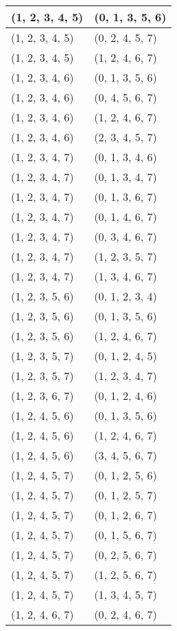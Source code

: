 \begin{footnotesize}
\begin{longtable}[c]{|l|l|}
\\ \hline
(1, 2, 3, 4, 5)
&(0, 1, 3, 5, 6)
\\ \hline
(1, 2, 3, 4, 5)
&(0, 2, 4, 5, 7)
\\ \hline
(1, 2, 3, 4, 5)
&(1, 2, 4, 6, 7)
\\ \hline
(1, 2, 3, 4, 6)
&(0, 1, 3, 5, 6)
\\ \hline
(1, 2, 3, 4, 6)
&(0, 4, 5, 6, 7)
\\ \hline
(1, 2, 3, 4, 6)
&(1, 2, 4, 6, 7)
\\ \hline
(1, 2, 3, 4, 6)
&(2, 3, 4, 5, 7)
\\ \hline
(1, 2, 3, 4, 7)
&(0, 1, 3, 4, 6)
\\ \hline
(1, 2, 3, 4, 7)
&(0, 1, 3, 4, 7)
\\ \hline
(1, 2, 3, 4, 7)
&(0, 1, 3, 6, 7)
\\ \hline
(1, 2, 3, 4, 7)
&(0, 1, 4, 6, 7)
\\ \hline
(1, 2, 3, 4, 7)
&(0, 3, 4, 6, 7)
\\ \hline
(1, 2, 3, 4, 7)
&(1, 2, 3, 5, 7)
\\ \hline
(1, 2, 3, 4, 7)
&(1, 3, 4, 6, 7)
\\ \hline
(1, 2, 3, 5, 6)
&(0, 1, 2, 3, 4)
\\ \hline
(1, 2, 3, 5, 6)
&(0, 1, 3, 5, 6)
\\ \hline
(1, 2, 3, 5, 6)
&(1, 2, 4, 6, 7)
\\ \hline
(1, 2, 3, 5, 7)
&(0, 1, 2, 4, 5)
\\ \hline
(1, 2, 3, 5, 7)
&(1, 2, 3, 4, 7)
\\ \hline
(1, 2, 3, 6, 7)
&(0, 1, 2, 4, 6)
\\ \hline
(1, 2, 4, 5, 6)
&(0, 1, 3, 5, 6)
\\ \hline
(1, 2, 4, 5, 6)
&(1, 2, 4, 6, 7)
\\ \hline
(1, 2, 4, 5, 6)
&(3, 4, 5, 6, 7)
\\ \hline
(1, 2, 4, 5, 7)
&(0, 1, 2, 5, 6)
\\ \hline
(1, 2, 4, 5, 7)
&(0, 1, 2, 5, 7)
\\ \hline
(1, 2, 4, 5, 7)
&(0, 1, 2, 6, 7)
\\ \hline
(1, 2, 4, 5, 7)
&(0, 1, 5, 6, 7)
\\ \hline
(1, 2, 4, 5, 7)
&(0, 2, 5, 6, 7)
\\ \hline
(1, 2, 4, 5, 7)
&(1, 2, 5, 6, 7)
\\ \hline
(1, 2, 4, 5, 7)
&(1, 3, 4, 5, 7)
\\ \hline
(1, 2, 4, 6, 7)
&(0, 2, 4, 6, 7)
\\ \hline

\end{longtable}
\end{footnotesize}
